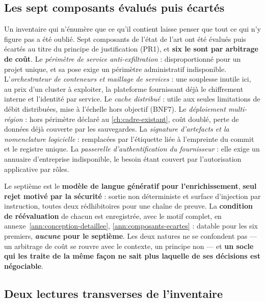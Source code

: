 \subsection{Les sept composants évalués puis écartés}
\label{sec:composants-ecartes}

Un inventaire qui n'énumère que ce qu'il contient laisse penser que tout ce qui n'y figure pas a
été oublié. Sept composants de l'état de l'art ont été évalués puis écartés au titre du principe
de justification (PR1), et \textbf{six le sont par arbitrage de coût}. Le \emph{périmètre de
service anti-exfiltration} : disproportionné pour un projet
unique, et sa pose exige un périmètre administratif indisponible. L'\emph{orchestrateur de
conteneurs et maillage de services} : une souplesse inutile ici, au prix d'un cluster à exploiter,
la plateforme fournissant déjà le chiffrement interne et l'identité par service. Le \emph{cache
distribué} : utile aux seules limitations de débit distribuées, mise à l'échelle hors objectif
(BNF7). Le \emph{déploiement multi-région} : hors périmètre déclaré au \cref{ch:cadre-existant},
coût doublé, perte de données déjà couverte par les sauvegardes. La \emph{signature d'artefacts
et la nomenclature logicielle} : remplacées par l'étiquette liée à l'empreinte du commit et le
registre unique. La \emph{passerelle d'authentification du fournisseur} : elle exige un annuaire
d'entreprise indisponible, le besoin étant couvert par l'autorisation applicative par rôles.

Le septième est le \textbf{modèle de langue génératif pour l'enrichissement}, \textbf{seul rejet
motivé par la sécurité} : sortie non déterministe et surface d'injection par instruction, toutes
deux rédhibitoires pour une chaîne de preuve. La \textbf{condition de réévaluation} de chacun est
enregistrée, avec le motif complet, en annexe~\ref{ann:conception-detaillee},
\cref{ann:composants-ecartes} : datable pour les six premiers, \textbf{\emph{aucune} pour le
septième}. Les deux natures ne se confondent pas --- un arbitrage de coût se rouvre avec le
contexte, un principe non --- et \textbf{un socle qui les traite de la même façon ne sait plus
laquelle de ses décisions est négociable}.

\subsection{Deux lectures transverses de l'inventaire}
\label{sec:lectures-transverses}

